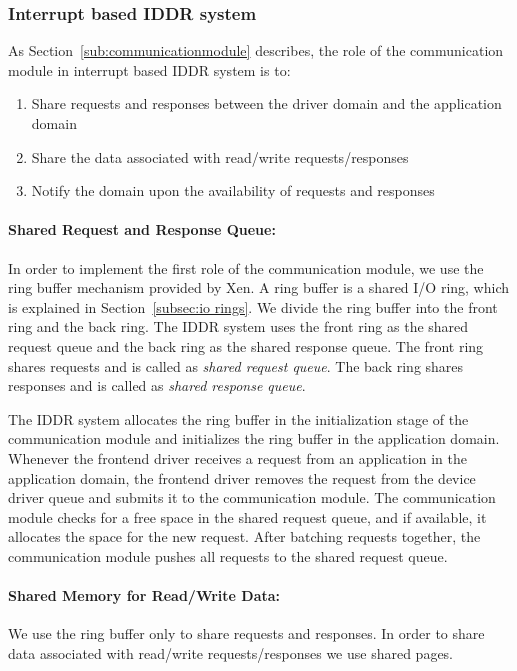 \subsubsection*{Interrupt based IDDR system}
As Section~\ref{sub:communicationmodule} describes, the role of the communication module in interrupt based IDDR system is to:
\begin{enumerate} 
\item Share requests and responses between the driver domain and the application domain
\item Share the data associated with read/write requests/responses
\item Notify the domain upon the availability of requests and responses 
\end{enumerate}
\paragraph{Shared Request and Response Queue:}
In order to implement the first role of the communication module, we use the ring buffer mechanism provided by Xen. A ring buffer is a shared I/O ring, which is explained in Section~\ref{subsec:io rings}. We divide the ring buffer into the front ring and the back ring. The IDDR system uses the front ring as the shared request queue and the back ring as the shared response queue. The front ring shares requests and is called as \textit{shared request queue}. The back ring shares responses and is called as \textit{shared response queue}. 

The IDDR system allocates the ring buffer in the initialization stage of the communication module and initializes the ring buffer in the application domain. Whenever the frontend driver receives a request from an application in the application domain, the frontend driver removes the request from the device driver queue and submits it to the communication module. The communication module checks for a free space in the shared request queue, and if available, it allocates the space for the new request. After batching requests together, the communication module pushes all requests to the shared request queue.

\paragraph{Shared Memory for Read/Write Data:}
We use the ring buffer only to share requests and responses. In order to share data associated with read/write requests/responses we use shared pages. 

